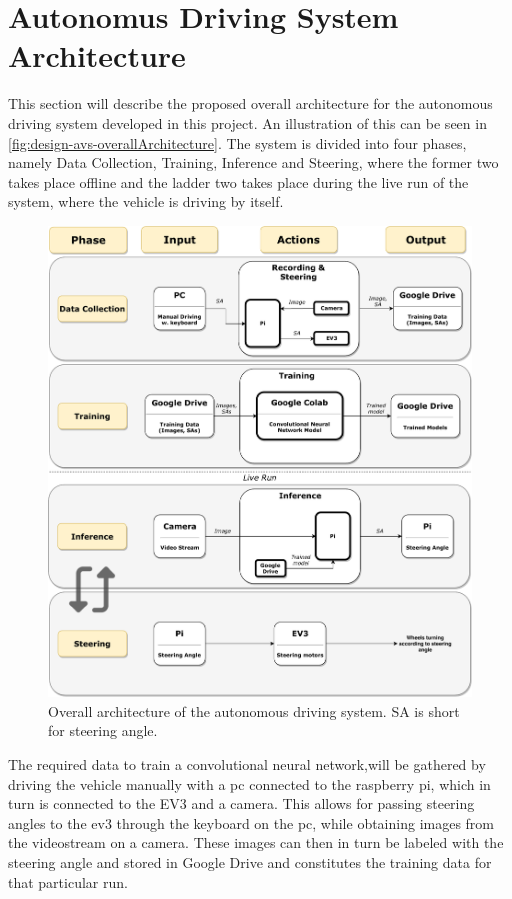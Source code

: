 \section{Autonomus Driving System Architecture}\label{sec:design-avSystemArchitecture}
This section will describe the proposed overall architecture for the autonomous driving system developed in this project. An illustration of this can be seen in \autoref{fig:design-avs-overallArchitecture}. The system is divided into four phases, namely Data Collection, Training, Inference and Steering, where the former two takes place offline and the ladder two takes place during the live run of the system, where the vehicle is driving by itself.

\begin{figure}[H]
    \centering
    \includegraphics[width=\textwidth]{images/design/overall-system-architecture.pdf}
    \caption{Overall architecture of the autonomous driving system. SA is short for steering angle.}
    \label{fig:design-avs-overallArchitecture}
\end{figure}

The required data to train a convolutional neural network,will be gathered by driving the vehicle manually with a pc connected to the raspberry pi, which in turn is connected to the EV3 and a camera. This allows for passing steering angles to the ev3 through the keyboard on the pc, while obtaining images from the videostream on a camera. These images can then in turn be labeled with the steering angle and stored in Google Drive and constitutes the training data for that particular run.

